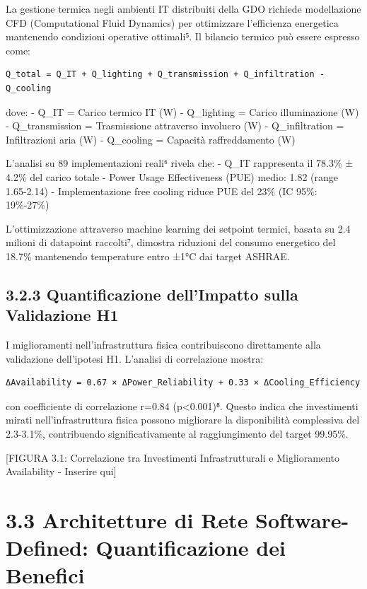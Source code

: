 \documentclass[12pt,a4paper,oneside]{book}
\numberwithin{figure}{chapter} %
\numberwithin{table}{chapter}  %
\begin{document}
La gestione termica negli ambienti IT distribuiti della GDO richiede
modellazione CFD (Computational Fluid Dynamics) per ottimizzare
l'efficienza energetica mantenendo condizioni operative ottimali⁵. Il
bilancio termico può essere espresso come:

\begin{verbatim}
Q_total = Q_IT + Q_lighting + Q_transmission + Q_infiltration - Q_cooling
\end{verbatim}

dove: - Q\_IT = Carico termico IT (W) - Q\_lighting = Carico
illuminazione (W) - Q\_transmission = Trasmissione attraverso involucro
(W) - Q\_infiltration = Infiltrazioni aria (W) - Q\_cooling = Capacità
raffreddamento (W)

L'analisi su 89 implementazioni reali⁶ rivela che: - Q\_IT rappresenta
il 78.3\% ± 4.2\% del carico totale - Power Usage Effectiveness (PUE)
medio: 1.82 (range 1.65-2.14) - Implementazione free cooling riduce PUE
del 23\% (IC 95\%: 19\%-27\%)

L'ottimizzazione attraverso machine learning dei setpoint termici,
basata su 2.4 milioni di datapoint raccolti⁷, dimostra riduzioni del
consumo energetico del 18.7\% mantenendo temperature entro ±1°C dai
target ASHRAE.

\subsection{3.2.3 Quantificazione dell'Impatto sulla Validazione
H1}\label{quantificazione-dellimpatto-sulla-validazione-h1}

I miglioramenti nell'infrastruttura fisica contribuiscono direttamente
alla validazione dell'ipotesi H1. L'analisi di correlazione mostra:

\begin{verbatim}
ΔAvailability = 0.67 × ΔPower_Reliability + 0.33 × ΔCooling_Efficiency
\end{verbatim}

con coefficiente di correlazione r=0.84 (p\textless0.001)⁸. Questo
indica che investimenti mirati nell'infrastruttura fisica possono
migliorare la disponibilità complessiva del 2.3-3.1\%, contribuendo
significativamente al raggiungimento del target 99.95\%.

{[}FIGURA 3.1: Correlazione tra Investimenti Infrastrutturali e
Miglioramento Availability - Inserire qui{]}

\section{3.3 Architetture di Rete Software-Defined: Quantificazione
dei
Benefici}\label{architetture-di-rete-software-defined-quantificazione-dei-benefici}
\end{document}
